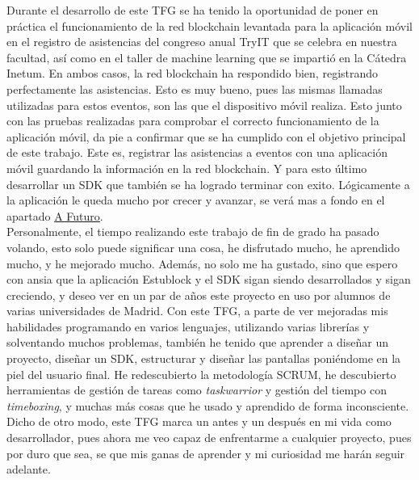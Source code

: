 Durante el desarrollo de este TFG se ha tenido la oportunidad de poner en práctica el funcionamiento de la red blockchain levantada para la aplicación móvil en el registro de asistencias del congreso anual TryIT que se celebra en nuestra facultad, así como en el taller de machine learning que se impartió en la Cátedra Inetum. En ambos casos, la red blockchain ha respondido bien, registrando perfectamente las asistencias. Esto es muy bueno, pues las mismas llamadas utilizadas para estos eventos, son las que el dispositivo móvil realiza. Esto junto con las pruebas realizadas para comprobar el correcto funcionamiento de la aplicación móvil, da pie a confirmar que se ha cumplido con el objetivo principal de este trabajo. Este es, registrar las asistencias a eventos con una aplicación móvil guardando la información en la red blockchain. Y para esto último desarrollar un SDK que también se ha logrado terminar con exito. Lógicamente a la aplicación le queda mucho por crecer y avanzar, se verá mas a fondo en el apartado \hyperref[cap:Futuro]{A Futuro}. \\

Personalmente, el tiempo realizando este trabajo de fin de grado ha pasado volando, esto solo puede significar una cosa, he disfrutado mucho, he aprendido mucho, y he mejorado mucho. Además, no solo me ha gustado, sino que espero con ansia que la aplicación Estublock y el SDK sigan siendo desarrollados y sigan creciendo, y deseo ver en un par de años este proyecto en uso por alumnos de varias universidades de Madrid. Con este TFG, a parte de ver mejoradas mis habilidades programando en varios lenguajes, utilizando varias librerías y solventando muchos problemas, también he tenido que aprender a diseñar un proyecto, diseñar un SDK, estructurar y diseñar las pantallas poniéndome en la piel del usuario final. He redescubierto la metodología SCRUM, he descubierto herramientas de gestión de tareas como \textit{taskwarrior} y gestión del tiempo con \textit{timeboxing}, y muchas más cosas que he usado y aprendido de forma inconsciente. Dicho de otro modo, este TFG marca un antes y un después en mi vida como desarrollador, pues ahora me veo capaz de enfrentarme a cualquier proyecto, pues por duro que sea, se que mis ganas de aprender y mi curiosidad me harán seguir adelante. 
